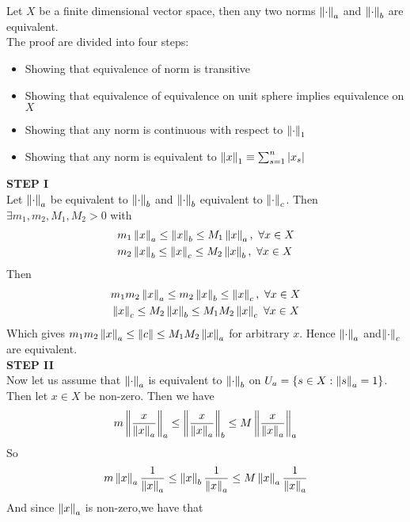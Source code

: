 \begin{theorem}\rm\nextline
	Let $X$ be a finite dimensional vector space, then any two norms $\left\|{\cdot}\right\|_a$ and $\left\|{\cdot}\right\|_b$ are equivalent.\\
	\pf The proof are divided into four steps:
	\begin{itemize}
		\item Showing that equivalence of norm is transitive
		\item Showing that equivalence of equivalence on unit sphere implies equivalence on $X$
		\item Showing that any norm is continuous with respect to $\left\|{\cdot}\right\|_1$
		\item Showing that any norm is equivalent to $\left\|{x}\right\|_1\equiv\sum_{s=1}^n |x_s|$
	\end{itemize}
	{\bf STEP I}\\
	Let $\left\|{\cdot}\right\|_a$ be equivalent to $\left\|{\cdot}\right\|_b$ and $\left\|{\cdot}\right\|_b$ equivalent to $\left\|{\cdot}\right\|_c$.
	Then $\exists m_1,m_2,M_1,M_2>0$ with
	\begin{equation}
		\begin{split}\nonumber
			&m_1\left\|{x}\right\|_a\leq \left\|{x}\right\|_b\leq M_1\left\|{x}\right\|_a,\,\,\forall x\in X\\
			&m_2\left\|{x}\right\|_b\leq \left\|{x}\right\|_c\leq M_2\left\|{x}\right\|_b,\,\,\forall x\in X
		\end{split}
	\end{equation}
	Then
	\begin{equation}
		\begin{split}\nonumber
			&m_1m_2\left\|{x}\right\|_a\leq m_2\left\|{x}\right\|_b\leq \left\|{x}\right\|_c,\,\,\forall x\in X\\
			&\left\|{x}\right\|_c\leq M_2\left\|{x}\right\|_b\leq M_1M_2\left\|{x}\right\|_c\,\,\forall x\in X
		\end{split}
	\end{equation}
	Which gives $m_1m_2\left\|{x}\right\|_a\leq\left\|{c}\right\|\leq M_1M_2\left\|{x}\right\|_a$ for arbitrary $x$. Hence $\left\|{\cdot}\right\|_a$ and$\left\|{\cdot}\right\|_c$ are equivalent.\\
	{\bf STEP II}\\
	Now let us assume that $\left\|{\cdot}\right\|_a$ is equivalent to $\left\|{\cdot}\right\|_b$ on $U_a=\{s\in X:\left\|{s}\right\|_a=1\}$.
	Then let $x\in X$ be non-zero. Then we have
	$$
		m\left\|{\frac{x}{\left\|{x}\right\|_a}}\right\|_a\leq \left\|{\frac{x}{\left\|{x}\right\|_a}}\right\|_b\leq M\left\|{\frac{x}{\left\|{x}\right\|_a}}\right\|_a
	$$
	So
	$$
		m\left\|{x}\right\|_a\frac{1}{\left\|{x}\right\|_a}\leq \left\|{x}\right\|_b\frac{1}{\left\|{x}\right\|_a}\leq M\left\|{x}\right\|_a\frac{1}{\left\|{x}\right\|_a}
	$$
	And since ${\left\|{x}\right\|_a}$ is non-zero,we have that

\end{theorem}
